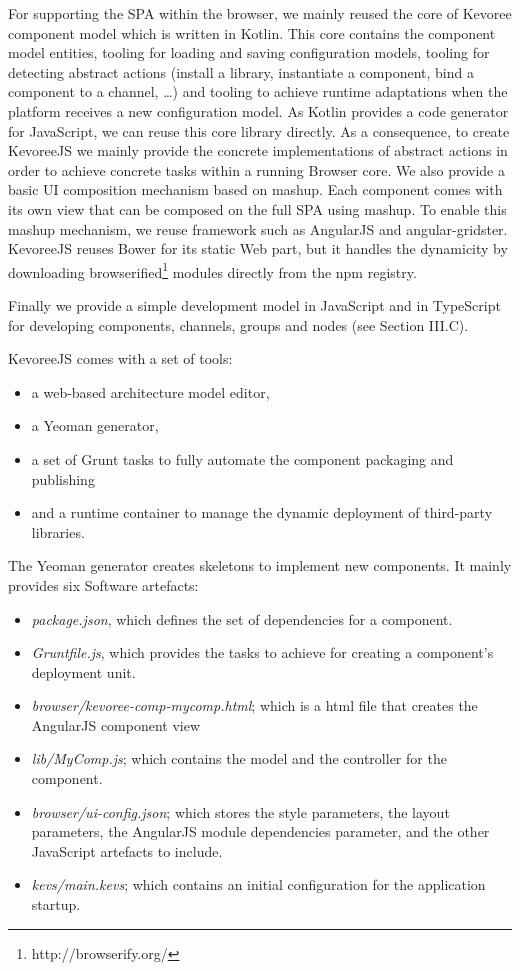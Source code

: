 For supporting the SPA within the browser, we mainly reused the core of Kevoree component model which is written in Kotlin. This core contains the component model entities, tooling for loading and saving configuration models, tooling for detecting abstract actions (install a library, instantiate a component, bind a component to a channel, \dots)  and tooling to achieve runtime adaptations when the platform receives a new configuration model. As Kotlin provides a code generator for JavaScript, we can reuse this core library directly. As a consequence, to create KevoreeJS we mainly provide the concrete implementations of abstract actions in order to achieve concrete tasks within a running Browser core. We also provide a basic UI composition mechanism based on mashup. Each component comes with its own view that can be composed on the full SPA using mashup. To enable this mashup mechanism, we reuse framework such as AngularJS and angular-gridster. KevoreeJS reuses Bower for its static Web part, but it handles the dynamicity by downloading browserified\footnote{http://browserify.org/} modules directly from the npm registry.


Finally we provide a simple development model in JavaScript and in TypeScript for developing components, channels, groups and nodes (see Section III.C).

KevoreeJS comes with a set of tools: 

\begin{itemize}
	\item a web-based architecture model editor, 
	\item a Yeoman generator, 
	\item a set of Grunt tasks to fully automate the component packaging and publishing 
	\item and a runtime container to manage the dynamic deployment of third-party libraries.
\end{itemize}


The Yeoman generator creates skeletons to implement new components. It mainly provides six Software artefacts:
\begin{itemize}
	\item \emph{package.json}, which defines the set of dependencies for a component.
	\item \emph{Gruntfile.js}, which provides the tasks to achieve for creating a component's deployment unit. 
	\item  \emph{browser/kevoree-comp-mycomp.html}; which is a html file that creates the AngularJS component view
	\item \emph{lib/MyComp.js}; which contains the model and the controller for the component.
	\item \emph{browser/ui-config.json}; which stores the style parameters, the layout parameters, the AngularJS module dependencies parameter, and the other JavaScript artefacts to include. 
	\item \emph{kevs/main.kevs}; which contains an initial configuration for the application startup. 
\end{itemize}


